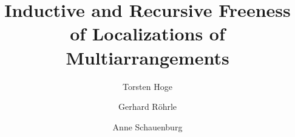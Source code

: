 
\usepackage{amsfonts, amssymb}
\usepackage{parskip, fullpage, verbatim}
\usepackage[colorlinks=true]{hyperref}
\usepackage{breakurl}

 

 

 

 
 
 
 
 
 
 
 
 

  
 
 

 

 

 

 
 

 

  
  
  
  

 


\theoremstyle{plain}
\newtheorem{lemma}[equation]{Lemma}
\newtheorem{theorem}[equation]{Theorem}
\newtheorem*{Theorem}{Theorem}
\newtheorem{conjecture}[equation]{Conjecture}
\newtheorem{corollary}[equation]{Corollary}
\newtheorem{proposition}[equation]{Proposition}
\theoremstyle{definition}
\newtheorem{defn}[equation]{Definition}
\newtheorem{remark}[equation]{Remark}
\newtheorem{example}[equation]{Example}




\title[ Inductive and Recursive Freeness of Localizations of Multiarrangements ]
{ Inductive and Recursive Freeness of Localizations of Multiarrangements} 

\author[T. Hoge]{Torsten Hoge}
\address
{Institut f\"ur Algebra, Zahlentheorie und Diskrete Mathematik,
Fakult\"at f\"ur Mathematik und Physik,
Leibniz Universit\"at Hannover,
Welfengarten 1,
30167 Hannover, Germany}

\author[G. R\"ohrle]{Gerhard R\"ohrle}
\address
{Fakult\"at f\"ur Mathematik,
Ruhr-Universit\"at Bochum,
D-44780 Bochum, Germany}

\author[A. Schauenburg]{Anne Schauenburg}


